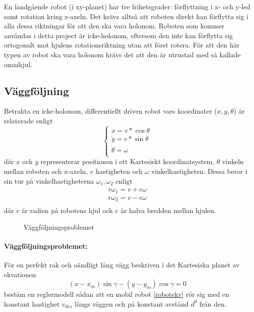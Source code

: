 \documentclass[11pt]{article}
\begin{document}
\begin{flushleft}
En landgående robot (i xy-planet) har tre frihetsgrader: förflyttning i x- och y-led samt rotation kring z-axeln. Det krävs alltså att roboten direkt kan förflytta sig i alla dessa riktningar för att den ska vara holonom. Roboten som kommer användas i detta project är icke-holonom, eftersom den inte kan förflytta sig ortogonalt mot hjulens rotationsriktning utan att först rotera. För att den här typen av robot ska vara holonom krävs det att den är utrustad med så kallade omnihjul.

\subsection{Väggföljning}
Betrakta en icke-holonom, differentiellt driven robot vars koordinater (\(x, y, \theta\)) är relaterade enligt
\begin{equation}\label{robotekv}
	\begin{cases}
  	\dot{x} = v * \cos \theta \\
  	\dot{y} = v * \sin \theta \\
   	 \dot{\theta} = \omega \\
  	\end{cases}
\end{equation}
där \(x\) och \(y\) representerar positionen i ett Kartesiskt koordinatsystem, \(\theta\) vinkeln mellan roboten och x-axeln, \(v\) hastigheten och \(\omega\) vinkelhastigheten. Dessa beror i sin tur på vinkelhastigheterna \(\omega_1, \omega_2\) enligt
\begin{equation}\label{hjulekv}
	\begin{aligned}
	r\omega_1 = v + e\omega \\
	r\omega_2 = v - e\omega \\
	\end{aligned}
\end{equation}
där \(r\) är radien på robotens hjul och \(e\) är halva bredden mellan hjulen.

\begin{figure}[H] %
\centering
\noindent{}
	\caption{Väggföljningsproblemet\label{robot}}	
\end{figure}

\paragraph{Väggföljningsproblemet:} 
\begin{it}
För en perfekt rak och oändligt lång vägg beskriven i det Kartesiska planet av ekvationen
\begin{equation}\label{väggfölj}
	(x - x_m) \sin\gamma - (y - y_m) \cos \gamma = 0
\end{equation}
bestäm en reglermodell sådan att en mobil robot \eqref{robotekv} rör sig med en konstant hastighet \(v_{des}\) längs väggen och på konstant avstånd \(d^0\) från den.
\end{it}


\end{flushleft}
\end{document}
